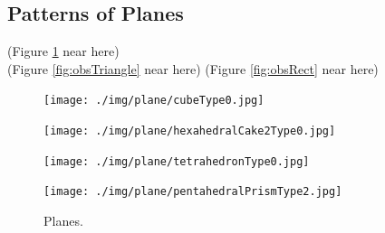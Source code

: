 \documentclass[suppldata, dvipdfmx]{interact}
\theoremstyle{plain}%
\theoremstyle{definition}
\theoremstyle{remark}
\theoremstyle{problemstyle}
\begin{document}
 

\subsection{Patterns of Planes}

\noindent(Figure \ref{fig:planes}
 near here)\\
(Figure \ref{fig:obsTriangle} near here)
(Figure \ref{fig:obsRect} near here)

\begin{figure}[h!tbp]
  \begin{minipage}[t]{0.23\textwidth}
   \centering
   \texttt{[image: ./img/plane/cubeType0.jpg]}
   \label{fig:planeCube}
  \end{minipage}
  \hspace*{\fill}
  \begin{minipage}[t]{0.23\textwidth}
   \centering
   \texttt{[image: ./img/plane/hexahedralCake2Type0.jpg]}
   \label{fig:planeCake}
  \end{minipage}
 \hspace*{\fill}
  \begin{minipage}[t]{0.23\textwidth}
   \centering
   \texttt{[image: ./img/plane/tetrahedronType0.jpg]}
   \label{fig:planeTetra}
  \end{minipage}
 \hspace*{\fill}
  \begin{minipage}[t]{0.23\textwidth}
   \centering
   \texttt{[image: ./img/plane/pentahedralPrismType2.jpg]}
   \label{fig:planePentaPrism}
  \end{minipage}
 \caption{Planes.}
 \label{fig:planes}
 \hspace*{\fill}
\end{figure}
\end{document}
